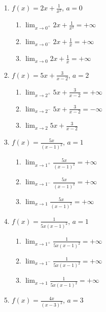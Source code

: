 \documentclass[a4paper, 12pt]{article}
\begin{document}
\begin{enumerate}
\begin{enumerate}
        \item $f(x) = 2x+ \frac{1}{x^2}$, $a=0$
        
        \begin{enumerate}
            \item $\lim_{x \to 0^+}2x+\frac{1}{x^2} = + \infty$
            \item $\lim_{x \to 0^-}2x+\frac{1}{x} = + \infty$
            \item $\lim_{x \to 0}2x+\frac{1}{x} = + \infty$
        \end{enumerate}

        \item $f(x) = 5x+ \frac{3}{x-2}$, $a=2$
        
        \begin{enumerate}
            \item $\lim_{x \to 2^+}5x+\frac{3}{x-2}=+\infty$
            \item $\lim_{x \to 2^-}5x+\frac{3}{x-2}=-\infty$
            \item $\lim_{x \to 2}5x+\frac{3}{x-2}$\naoexiste
        \end{enumerate}

        \item $f(x) = \frac{5x}{(x-1)^2}$, $a=1$
        
        \begin{enumerate}
            \item $\lim_{x \to 1^+}\frac{5x}{(x-1)^2}=+\infty$
            \item $\lim_{x \to 1^-}\frac{5x}{(x-1)^2}=+\infty$
            \item $\lim_{x \to 1}\frac{5x}{(x-1)^2}=+\infty$
        \end{enumerate}

        \item $f(x) = \frac{1}{5x(x-1)^2}$, $a=1$
        
        \begin{enumerate}
            \item $\lim_{x \to 1^+}\frac{1}{5x(x-1)^2}=+\infty$
            \item $\lim_{x \to 1^-}\frac{1}{5x(x-1)^2}=+\infty$
            \item $\lim_{x \to 1}\frac{1}{5x(x-1)^2}=+\infty$ 
        \end{enumerate}

        \item $f(x) = \frac{4x}{(x-3)^2}$, $a=3$
        

\end{enumerate}
\end{enumerate}
\end{document}
